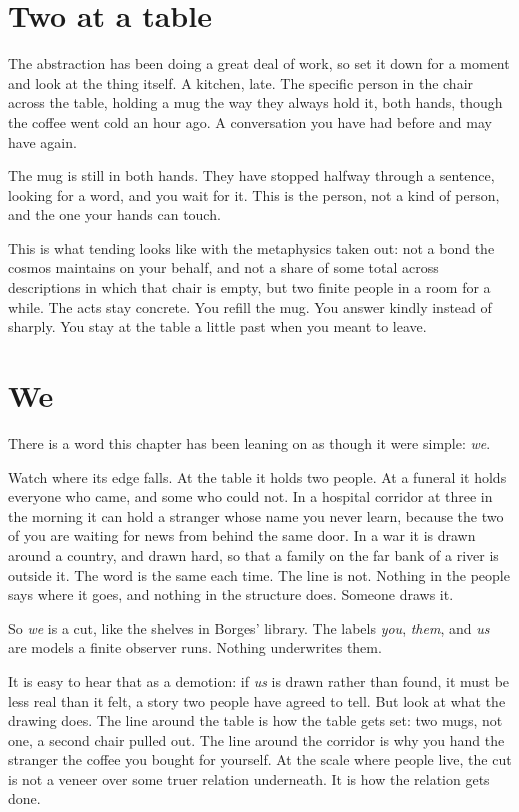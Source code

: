 \section*{Two at a table}

The abstraction has been doing a great deal of work, so set it down for a moment and look at the thing itself. A kitchen, late. The specific person in the chair across the table, holding a mug the way they always hold it, both hands, though the coffee went cold an hour ago. A conversation you have had before and may have again.

The mug is still in both hands. They have stopped halfway through a sentence, looking for a word, and you wait for it. This is the person, not a kind of person, and the one your hands can touch.

This is what tending looks like with the metaphysics taken out: not a bond the cosmos maintains on your behalf, and not a share of some total across descriptions in which that chair is empty, but two finite people in a room for a while. The acts stay concrete. You refill the mug. You answer kindly instead of sharply. You stay at the table a little past when you meant to leave.

\section*{We}

There is a word this chapter has been leaning on as though it were simple: \emph{we}.

Watch where its edge falls. At the table it holds two people. At a funeral it holds everyone who came, and some who could not. In a hospital corridor at three in the morning it can hold a stranger whose name you never learn, because the two of you are waiting for news from behind the same door. In a war it is drawn around a country, and drawn hard, so that a family on the far bank of a river is outside it. The word is the same each time. The line is not. Nothing in the people says where it goes, and nothing in the structure does. Someone draws it.

So \emph{we} is a cut, like the shelves in Borges' library. The labels \emph{you}, \emph{them}, and \emph{us} are models a finite observer runs. Nothing underwrites them.

It is easy to hear that as a demotion: if \emph{us} is drawn rather than found, it must be less real than it felt, a story two people have agreed to tell. But look at what the drawing does. The line around the table is how the table gets set: two mugs, not one, a second chair pulled out. The line around the corridor is why you hand the stranger the coffee you bought for yourself. At the scale where people live, the cut is not a veneer over some truer relation underneath. It is how the relation gets done.

